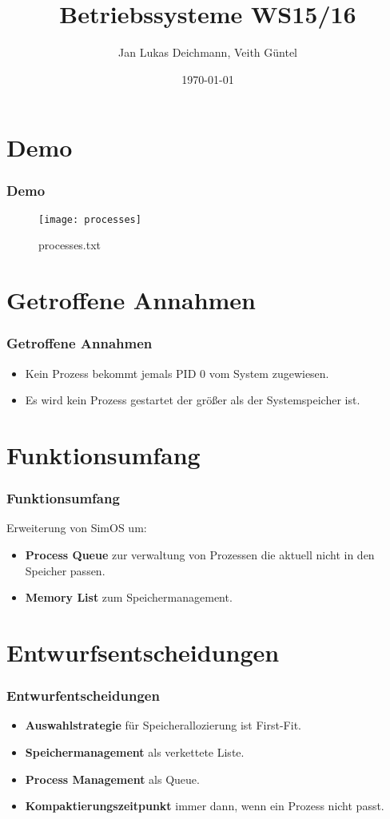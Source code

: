 \documentclass{beamer}
\author{Jan Lukas Deichmann, Veith Güntel}
\title{Betriebssysteme WS15/16}
\date{\today}
\begin{document}
\maketitle
\frame{\tableofcontents}

\section{Demo}
\begin{frame}
\frametitle{Demo}
\begin{figure}[!h]
    \texttt{[image: processes]}
    \caption{processes.txt}
\end{figure}
\end{frame}

\section{Getroffene Annahmen}
\begin{frame}
\frametitle{Getroffene Annahmen}
\begin{itemize}
	\item Kein Prozess bekommt jemals PID 0 vom System zugewiesen.
	\item Es wird kein Prozess gestartet der größer als der Systemspeicher ist.
\end{itemize}
\end{frame}

\section{Funktionsumfang}
\begin{frame}
\frametitle{Funktionsumfang}
Erweiterung von SimOS um:
\begin{itemize}
	\item \textbf{Process Queue} zur verwaltung von Prozessen die aktuell nicht in den Speicher passen.
	\item \textbf{Memory List} zum Speichermanagement.
\end{itemize}
\end{frame}

\section{Entwurfsentscheidungen}
\begin{frame}
\frametitle{Entwurfentscheidungen}
\begin{itemize}
	\item \textbf{Auswahlstrategie} für Speicherallozierung ist First-Fit.
	\item \textbf{Speichermanagement} als verkettete Liste.
	\item \textbf{Process Management} als Queue.
	\item \textbf{Kompaktierungszeitpunkt} immer dann, wenn ein Prozess nicht passt.
\end{itemize}
\end{frame}
\end{document}
